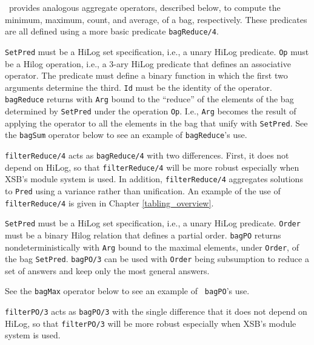\ourprolog\ provides analogous aggregate operators, described below, to
compute the minimum, maximum, count, and average, of a bag,
respectively.  These predicates are all defined using a more basic
predicate \verb|bagReduce/4|.

\begin{description}

{\tt SetPred} must be a HiLog set specification, i.e., a unary HiLog
predicate.  {\tt Op} must be a Hilog operation, i.e., a 3-ary HiLog
predicate that defines an associative operator.  The predicate must
define a binary function in which the first two arguments determine
the third.  {\tt Id} must be the identity of the operator.  {\tt
bagReduce} returns with {\tt Arg} bound to the ``reduce'' of the
elements of the bag determined by {\tt SetPred} under the operation
{\tt Op}.  I.e., {\tt Arg} becomes the result of applying the operator
to all the elements in the bag that unify with {\tt SetPred}.  See the
{\tt bagSum} operator below to see an example of {\tt bagReduce}'s
use.

{\tt filterReduce/4} acts as {\tt bagReduce/4} with two differences.
First, it does not depend on HiLog, so that {\tt filterReduce/4} will
be more robust especially when XSB's module system is used.  In
addition, {\tt filterReduce/4} aggregates solutions to {\tt Pred}
using a variance rather than unification.  An example of the use of
{\tt filterReduce/4} is given in Chapter \ref{tabling_overview}.

    {\tt SetPred} must be a HiLog set specification, i.e., a unary
    HiLog predicate.  {\tt Order} must be a binary Hilog relation that
    defines a partial order.  {\tt bagPO} returns nondeterministically
    with {\tt Arg} bound to the maximal elements, under {\tt Order}, of
    the bag {\tt SetPred}.  {\tt bagPO/3} can be used with {\tt Order}
    being subsumption to reduce a set of answers and keep only the most
    general answers.

    See the {\tt bagMax} operator below to see an example of {\tt
    bagPO}'s use.

{\tt filterPO/3} acts as {\tt bagPO/3} with the single difference that
it does not depend on HiLog, so that {\tt filterPO/3} will be more
robust especially when XSB's module system is used.


\end{description}
